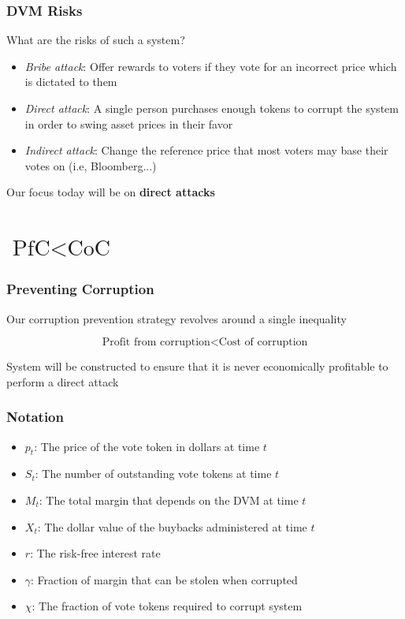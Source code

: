 \documentclass[10pt]{beamer}
\begin{document}
  \begin{frame} \frametitle{DVM Risks}

    What are the risks of such a system?

    \vspace{0.20cm}

    \begin{itemize}
      \item \textit{Bribe attack}: Offer rewards to voters if they vote for an incorrect price which
            is dictated to them
      \item \textit{Direct attack}: A single person purchases enough tokens to corrupt the system in
            order to swing asset prices in their favor
      \item \textit{Indirect attack}: Change the reference price that most voters may base their
            votes on (i.e, Bloomberg...)
    \end{itemize}

    Our focus today will be on \textbf{direct attacks}

  \end{frame}


\section{$\text{PfC} < \text{CoC}$}

  \begin{frame} \frametitle{Preventing Corruption}

    Our corruption prevention strategy revolves around a single inequality

    $$\text{Profit from corruption} < \text{Cost of corruption}$$

    System will be constructed to ensure that it is never economically profitable to perform a
    direct attack

  \end{frame}

  \begin{frame} \frametitle{Notation}

    \begin{itemize}
      \item $p_t$: The price of the vote token in dollars at time $t$
      \item $S_t$: The number of outstanding vote tokens at time $t$
      \item $M_t$: The total margin that depends on the DVM at time $t$
      \item $X_t$: The dollar value of the buybacks administered at time $t$
      \item $r$: The risk-free interest rate
      \item $\gamma$: Fraction of margin that can be stolen when corrupted
      \item $\chi$: The fraction of vote tokens required to corrupt system
    \end{itemize}

  \end{frame}
\end{document}
